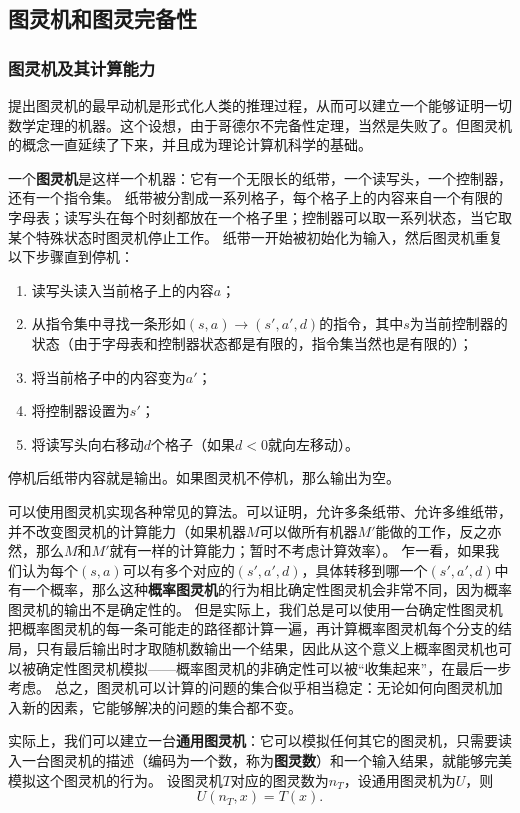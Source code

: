 \documentclass[UTF8, a4paper]{ctexart}
\begin{document}
\subsection{图灵机和图灵完备性}

\subsubsection{图灵机及其计算能力}

提出图灵机的最早动机是形式化人类的推理过程，从而可以建立一个能够证明一切数学定理的机器。这个设想，由于哥德尔不完备性定理，当然是失败了。但图灵机的概念一直延续了下来，并且成为理论计算机科学的基础。

一个\textbf{图灵机}是这样一个机器：它有一个无限长的纸带，一个读写头，一个控制器，还有一个指令集。
纸带被分割成一系列格子，每个格子上的内容来自一个有限的字母表；读写头在每个时刻都放在一个格子里；控制器可以取一系列状态，当它取某个特殊状态时图灵机停止工作。
纸带一开始被初始化为输入，然后图灵机重复以下步骤直到停机：
\begin{enumerate}
    \item 读写头读入当前格子上的内容$a$；
    \item 从指令集中寻找一条形如$(s, a) \longrightarrow (s', a', d)$的指令，其中$s$为当前控制器的状态（由于字母表和控制器状态都是有限的，指令集当然也是有限的）；
    \item 将当前格子中的内容变为$a'$；
    \item 将控制器设置为$s'$；
    \item 将读写头向右移动$d$个格子（如果$d<0$就向左移动）。
\end{enumerate}
停机后纸带内容就是输出。如果图灵机不停机，那么输出为空。

可以使用图灵机实现各种常见的算法。可以证明，允许多条纸带、允许多维纸带，并不改变图灵机的计算能力（如果机器$M$可以做所有机器$M'$能做的工作，反之亦然，那么$M$和$M'$就有一样的计算能力；暂时不考虑计算效率）。
乍一看，如果我们认为每个$(s, a)$可以有多个对应的$(s', a', d)$，具体转移到哪一个$(s', a', d)$中有一个概率，那么这种\textbf{概率图灵机}的行为相比确定性图灵机会非常不同，因为概率图灵机的输出不是确定性的。
但是实际上，我们总是可以使用一台确定性图灵机把概率图灵机的每一条可能走的路径都计算一遍，再计算概率图灵机每个分支的结局，只有最后输出时才取随机数输出一个结果，因此从这个意义上概率图灵机也可以被确定性图灵机模拟——概率图灵机的非确定性可以被“收集起来”，在最后一步考虑。
总之，图灵机可以计算的问题的集合似乎相当稳定：无论如何向图灵机加入新的因素，它能够解决的问题的集合都不变。

实际上，我们可以建立一台\textbf{通用图灵机}：它可以模拟任何其它的图灵机，只需要读入一台图灵机的描述（编码为一个数，称为\textbf{图灵数}）和一个输入结果，就能够完美模拟这个图灵机的行为。
设图灵机$T$对应的图灵数为$n_T$，设通用图灵机为$U$，则
\begin{equation}
    U(n_T, x) = T(x).
\end{equation}
\end{document}
